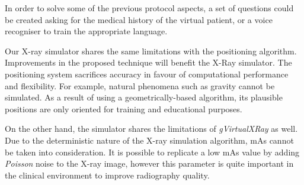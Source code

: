 In order to solve some of the previous protocol aspects, a set of questions could be created asking for the medical history of the virtual patient, or a voice recogniser to train the appropriate language.


Our X-ray simulator shares the same limitations with the positioning algorithm. Improvements in the proposed technique will benefit the X-Ray simulator. The positioning system sacrifices accuracy in favour of computational performance and flexibility. For example, natural phenomena such as gravity cannot be simulated. As a result of using a geometrically-based algorithm, its plausible positions are only oriented for training and educational purposes.



On the other hand, the simulator shares the limitations of \emph{gVirtualXRay} as well. Due to the deterministic nature of the X-ray simulation algorithm, mAs cannot be taken into consideration. It is possible to replicate a low mAs value by adding \emph{Poisson} noise to the X-ray image, however this parameter is quite important in the clinical environment to improve radiography quality.

